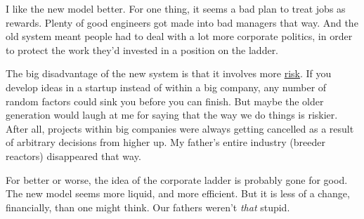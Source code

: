 I like the new model better. For one thing, it seems a bad plan to treat
jobs as rewards. Plenty of good engineers got made into bad managers
that way. And the old system meant people had to deal with a lot more
corporate politics, in order to protect the work they'd invested in a
position on the ladder.

The big disadvantage of the new system is that it involves more
\href{inequality.html}{risk}. If you develop ideas in a startup instead
of within a big company, any number of random factors could sink you
before you can finish. But maybe the older generation would laugh at me
for saying that the way we do things is riskier. After all, projects
within big companies were always getting cancelled as a result of
arbitrary decisions from higher up. My father's entire industry (breeder
reactors) disappeared that way.

For better or worse, the idea of the corporate ladder is probably gone
for good. The new model seems more liquid, and more efficient. But it is
less of a change, financially, than one might think. Our fathers weren't
\emph{that} stupid.
